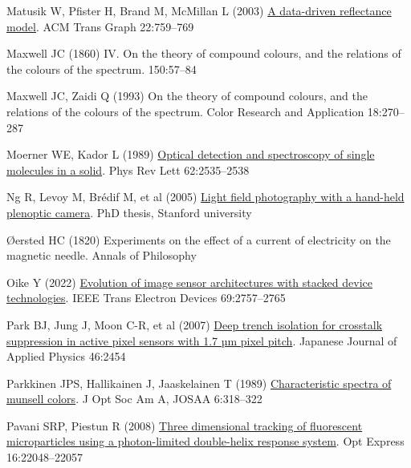 \documentclass[
  letterpaper,
]{book}
\newlength{\cslhangindent}
\newenvironment{CSLReferences}[2] %
 {\begin{list}{}{%
  \setlength{\itemindent}{0pt}
  \setlength{\leftmargin}{0pt}
  \setlength{\parsep}{0pt}
  \ifodd #1
   \setlength{\leftmargin}{\cslhangindent}
   \setlength{\itemindent}{-1\cslhangindent}
  \fi
  \setlength{\itemsep}{#2\baselineskip}}}
 {\end{list}}
\begin{document}
\begin{CSLReferences}{1}{1}
Matusik W, Pfister H, Brand M, McMillan L (2003)
\href{https://dl.acm.org/doi/10.1145/882262.882343}{A data-driven
reflectance model}. ACM Trans Graph 22:759--769

Maxwell JC (1860) {IV}. {On} the theory of compound colours, and the
relations of the colours of the spectrum. 150:57--84

Maxwell JC, Zaidi Q (1993) On the theory of compound colours, and the
relations of the colours of the spectrum. Color Research and Application
18:270--287

Moerner WE, Kador L (1989)
\href{http://dx.doi.org/10.1103/physrevlett.62.2535}{Optical detection
and spectroscopy of single molecules in a solid}. Phys Rev Lett
62:2535--2538

Ng R, Levoy M, Brédif M, et al (2005)
\href{'https://hal.science/hal-02551481'}{Light field photography with a
hand-held plenoptic camera}. PhD thesis, Stanford university

Øersted HC (1820) Experiments on the effect of a current of electricity
on the magnetic needle. Annals of Philosophy

Oike Y (2022)
\href{https://ieeexplore.ieee.org/abstract/document/9494712/}{Evolution
of image sensor architectures with stacked device technologies}. IEEE
Trans Electron Devices 69:2757--2765

Park BJ, Jung J, Moon C-R, et al (2007)
\href{http://dx.doi.org/10.1143/jjap.46.2454/meta}{Deep trench isolation
for crosstalk suppression in active pixel sensors with 1.7 µm pixel
pitch}. Japanese Journal of Applied Physics 46:2454

Parkkinen JPS, Hallikainen J, Jaaskelainen T (1989)
\href{https://opg.optica.org/abstract.cfm?uri=josaa-6-2-318}{Characteristic
spectra of munsell colors}. J Opt Soc Am A, JOSAA 6:318--322

Pavani SRP, Piestun R (2008)
\href{http://dx.doi.org/10.1364/OE.16.022048}{Three dimensional tracking
of fluorescent microparticles using a photon-limited double-helix
response system}. Opt Express 16:22048--22057


\end{CSLReferences}
\end{document}
